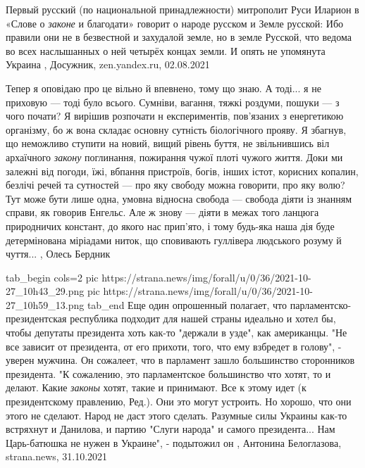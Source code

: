 Первый русский (по национальной принадлежности) митрополит Руси Иларион в
«Слове о \emph{законе} и благодати» говорит о народе русском и Земле русской:
Ибо правили они не в безвестной и захудалой земле, но в земле Русской, что
ведома во всех наслышанных о ней четырёх концах земли.
И опять не упомянута Украина
, Досужник, zen.yandex.ru, 02.08.2021

Тепер я оповідаю про це вільно й впевнено, тому що знаю. А тоді... я не приховую
— тоді було всього. Сумніви, вагання, тяжкі роздуми, пошуки — з чого почати? Я
вирішив розпочати н експериментів, пов’язаних з енергетикою організму, бо ж
вона складає основну сутність біологічного прояву. Я збагнув, що неможливо
ступити на новий, вищий рівень буття, не звільнившись віл архаїчного \emph{закону}
поглинання, пожирання чужої плоті чужого життя. Доки ми залежні від погоди,
їжі, вбпання пристроїв, богів, інших істот, корисних копалин, безлічі речей та
сутностей — про яку свободу можна говорити, про яку волю? Тут може бути лише
одна, умовна відносна свобода — свобода діяти із знанням справи, як говорив
Енгельс. Але ж знову — діяти в межах того ланцюга природничих констант, до
якого нас прип'ято, і тому будь-яка наша дія буде детермінована міріадами
ниток, що сповивають гуллівера людського розуму й чуття...
, Олесь Бердник


\ifcmt
  tab_begin cols=2
     pic https://strana.news/img/forall/u/0/36/2021-10-27_10h43_29.png
     pic https://strana.news/img/forall/u/0/36/2021-10-27_10h59_13.png
  tab_end
\fi
Еще один опрошенный полагает, что парламентско-президентская республика
подходит для нашей страны идеально и хотел бы, чтобы депутаты президента хоть
как-то "держали в узде", как американцы. "Не все зависит от президента, от его
прихоти, того, что ему взбредет в голову", - уверен мужчина.  Он сожалеет, что
в парламент зашло большинство сторонников президента.  "К сожалению, это
парламентское большинство что хотят, то и делают. Какие \emph{законы} хотят, такие и
принимают. Все к этому идет (к президентскому правлению, Ред.). Они это могут
устроить. Но хорошо, что они этого не сделают. Народ не даст этого сделать.
Разумные силы Украины как-то встряхнут и Данилова, и партию "Слуги народа" и
самого президента... Нам Царь-батюшка не нужен в Украине", - подытожил он
, 
Антонина Белоглазова, strana.news, 31.10.2021

